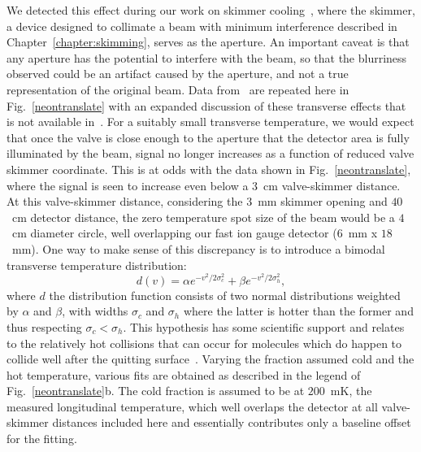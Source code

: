 We detected this effect during our work on skimmer cooling~\cite{Wu2018}, where the skimmer, a device designed to collimate a beam with minimum interference described in Chapter~\ref{chapter:skimming}, serves as the aperture. 
An important caveat is that any aperture has the potential to interfere with the beam, so that the blurriness observed could be an artifact caused by the aperture, and not a true representation of the original beam.
Data from~\citep[Fig.~2c]{Wu2018} are repeated here in Fig.~\ref{neontranslate} with an expanded discussion of these transverse effects that is not available in~\cite{Wu2018}.
For a suitably small transverse temperature, we would expect that once the valve is close enough to the aperture that the detector area is fully illuminated by the beam, signal no longer increases as a function of reduced valve skimmer coordinate.
This is at odds with the data shown in Fig.~\ref{neontranslate}, where the signal is seen to increase even below a $3$~cm valve-skimmer distance.
At this valve-skimmer distance, considering the $3$~mm skimmer opening and $40$~cm detector distance, the zero temperature spot size of the beam would be a $4$~cm diameter circle, well overlapping our fast ion gauge detector ($6$~mm x $18$~mm).
One way to make sense of this discrepancy is to introduce a bimodal transverse temperature distribution:
\begin{equation}
d(v) = \alpha e^{-v^2/2\sigma_c^2} + \beta e^{-v^2/2\sigma_h^2},
\end{equation}
where $d$ the distribution function consists of two normal distributions weighted by $\alpha$ and $\beta$, with widths $\sigma_c$ and $\sigma_h$ where the latter is hotter than the former and thus respecting $\sigma_c < \sigma_h$.
This hypothesis has some scientific support and relates to the relatively hot collisions that can occur for molecules which do happen to collide well after the quitting surface~\cite{beijerinck1981,Miller1988}. 
Varying the fraction assumed cold and the hot temperature, various fits are obtained as described in the legend of Fig.~\ref{neontranslate}b.
The cold fraction is assumed to be at $200$~mK, the measured longitudinal temperature, which well overlaps the detector at all valve-skimmer distances included here and essentially contributes only a baseline offset for the fitting.
